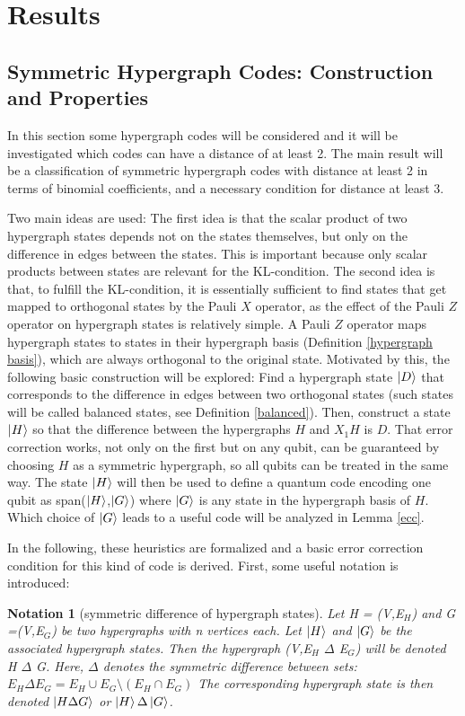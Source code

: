 \documentclass[12pt]{iopart}
\newtheorem{notation}[lemma]{Notation}
\begin{document}
\section{Results}

\subsection{Symmetric Hypergraph Codes: Construction and Properties}

In this section some hypergraph codes will be considered and it will be investigated which codes can have a distance of at least 2. The main result will be a classification of symmetric hypergraph codes with distance at least 2 in terms of binomial coefficients, and a necessary condition for distance at least 3.

Two main ideas are used:
The first idea is that the scalar product of two hypergraph states depends not on the states themselves, but only on the difference in edges between the states. This is important because only scalar products between states are relevant for the KL-condition.
The second idea is that, to fulfill the KL-condition, it is essentially sufficient to find states that get mapped to orthogonal states by the Pauli $X$ operator, as the effect of the Pauli $Z$ operator on hypergraph states is relatively simple. A Pauli $Z$ operator maps hypergraph states to states in their hypergraph basis (Definition \ref{hypergraph basis}), which are always orthogonal to the original state. 
Motivated by this, the following basic construction will be explored:
Find a hypergraph state $\ket{D}$ that corresponds to the difference in edges between two orthogonal states (such states will be called balanced states, see Definition \ref{balanced}). Then, construct a state $\ket{H}$ so that the difference between the hypergraphs $H$ and $X_1H$ is $D$. That error correction works, not only on the first but on any qubit, can be guaranteed by choosing $H$ as a symmetric hypergraph, so all qubits can be treated in the same way. The state $\ket{H}$ will then be used to define a quantum code encoding one qubit as span($\ket{H}$,$\ket{G}$) where $\ket{G}$ is any state in the hypergraph basis of $H$. Which choice of $\ket{G}$ leads to a useful code will be analyzed in Lemma \ref{ecc}.

In the following, these heuristics are formalized and a basic error correction condition for this kind of code is derived.
First, some useful notation is introduced:

\begin{notation}[symmetric difference of hypergraph states]
\label{NotationSymmetric}
Let H = (V,E$_H$) and G =(V,E$_G$) be two hypergraphs with n vertices each. Let $\ket{H}$ and $\ket{G}$ be the associated hypergraph states. Then  the hypergraph (V,E$_H$ $\Delta$ E$_G$) will be denoted  H $\Delta$ G. Here, $\Delta$ denotes the symmetric difference between sets: $E_H \Delta E_G = E_H \cup E_G \setminus (E_H \cap E_G)$  The corresponding hypergraph state is then denoted $\ket{H \Delta G}$ or $\ket{H} \Delta \ket{G}$.
\end{notation}
\end{document}
